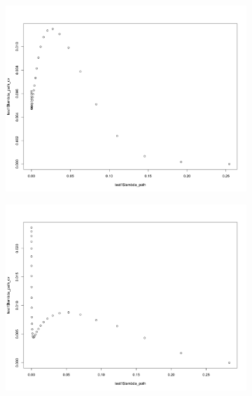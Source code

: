 \documentclass[letterpaper]{article}
\begin{document}
\begin{figure}[H]
\centering
\begin{subfigure}{0.5\textwidth}
  \centering
  \includegraphics[width=1\linewidth]{./result_plot/ll_use_k/7wrong_path_plot}
\end{subfigure}%
\begin{subfigure}{.5\textwidth}
  \centering
  \includegraphics[width=1\linewidth]{./result_plot/ll_use_k/8wrong_path_plot}
\end{subfigure}

\end{figure}
\end{document}
